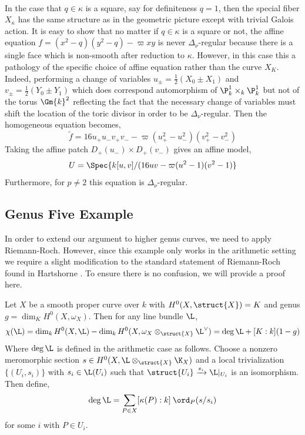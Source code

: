 \bigskip\\
In the case that $q \in \kappa$ is a square, say for definiteness $q = 1$, then the special fiber $X_\kappa$ has the same structure as in the geometric picture except with trivial Galois action. It is easy to show that no matter if $q \in \kappa$ is a square or not, the affine equation $f = (x^2 - q)(y^2 - q) - \varpi xy$ is never $\Delta_\nu$-regular because there is a single face which is non-smooth after reduction to $\kappa$. However, in this case this a pathology of the specific choice of affine equation rather than the curve $X_K$. Indeed, performing a change of variables $u_{\pm} = \tfrac{1}{2}(X_0 \pm X_1)$ and $v_{\pm} = \tfrac{1}{2}(Y_0 \pm Y_1)$ which does correspond automorphism of $\P^1_k \times_k \P^1_k$ but not of the torus $\Gm{k}^2$ reflecting the fact that the necessary change of variables must shift the location of the toric divisor in order to be $\Delta_\nu$-regular. Then the homogeneous equation becomes, 
\[ \tilde{f} = 16 u_+ u_{-} v_{+} v_{-} - \varpi (u_{+}^2 - u_{-}^2) (v_{+}^2 - v_{-}^2) \]
Taking the affine patch $D_{+}(u_{-}) \times D_+(v_{-})$ gives an affine model,
\[ U = \Spec{k[u,v]/(16 uv - \varpi (u^2 - 1)(v^2 - 1)} \]
Furthermore, for $p \neq 2$ this equation is $\Delta_\nu$-regular. 


\subsection{Genus Five Example}


In order to extend our argument to higher genus curves, we need to apply Riemann-Roch. However, since this example only works in the arithmetic setting we require a slight modification to the standard statement of Riemann-Roch found in Hartshorne \cite[Thm. IV.1.3]{har}. To ensure there is no confusion, we will provide a proof here.

\begin{theorem}
Let $X$ be a smooth proper curve over $k$ with $H^0(X, \struct{X}) = K$ and genus $g = \dim_K H^0(X, \omega_X)$. Then for any line bundle $\L$,
\[ \chi(\L) = \dim_k H^0(X, \L) - \dim_k H^0(X, \omega_X \otimes_{\struct{X}} \L^\vee) = \deg{\L} + [ K : k ] (1 - g) \]
Where $\deg{\L}$ is defined in the arithmetic case as follows. Choose a nonzero meromorphic section $s \in H^0(X, \L \otimes_{\struct{X}} \K_X)$ and a local trivialization $\{ (U_i, s_i) \}$ with $s_i \in \L(U_i)$ such that $\struct{U_i} \xrightarrow{s_i} \L|_{U_i}$ is an isomorphism. Then define,
\[ \deg{\L} = \sum_{P \in X} [\kappa(P) : k] \: \ord_{P}(s/s_i) \] 
for some $i$ with $P \in U_i$. 
\end{theorem}

